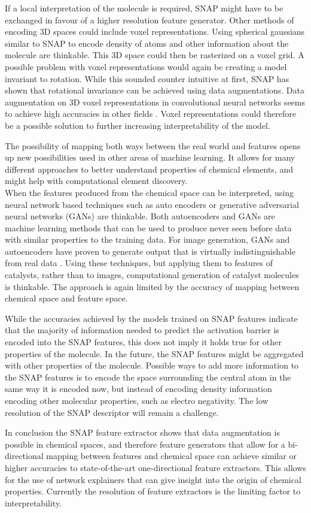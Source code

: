 If a local interpretation of the molecule is required, SNAP might have to be exchanged in favour of a higher resolution 
feature generator.
Other methods of encoding 3D spaces could include voxel representations.
Using spherical gaussians similar to SNAP to encode density of atoms and other information about the molecule are thinkable.
This 3D space could then be rasterized on a voxel grid.
A possible problem with voxel representations would again be creating a model invariant to rotation.
While this sounded counter intuitive at first, SNAP has shown that rotational invariance can be achieved using data augmentations.
Data augmentation on 3D voxel representations in convolutional neural networks seems to achieve high accuracies in 
other fields \cite{7353481}.
Voxel representations could therefore be a possible solution to further increasing interpretability of the model.

The possibility of mapping both ways between the real world and features opens up new possibilities 
used in other areas of machine learning.
It allows for many different approaches to better understand properties of chemical elements, 
and might help with computational element discovery.
\\
When the features produced from the chemical space can be interpreted,
using neural network based techniques such as auto encoders or generative adversarial neural networks (GANs) are thinkable.
Both autoencoders and GANs are machine learning methods that can be used to produce never seen before data with similar properties
to the training data.
For image generation, GANs and autoencoders have proven to generate output that is virtually indistinguishable from real data \cite{karras2019stylebased} .
Using these techniques, but applying them to features of catalysts, rather than to images, computational generation of catalyst molecules is thinkable.
The approach is again limited by the accuracy of mapping between chemical space and feature space.

While the accuracies achieved by the models trained on SNAP features indicate that 
the majority of information needed to predict the activation barrier is encoded into the SNAP features, this does
not imply it holds true for other properties of the molecule.
In the future, the SNAP features might be aggregated with other properties of the molecule.
Possible ways to add more information to the SNAP features is to encode the space surrounding the 
central atom in the same way it is encoded now, but instead of encoding density information encoding 
other molecular properties, such as electro negativity.
The low resolution of the SNAP descriptor will remain a challenge.

In conclusion the SNAP feature extractor shows that data augmentation is possible in chemical spaces, and therefore 
feature generators that allow for a bi-directional mapping between features and chemical space can achieve similar or higher
accuracies to state-of-the-art one-directional feature extractors.
This allows for the use of network explainers that can give insight into the origin of chemical properties.
Currently the resolution of feature extractors is the limiting factor to interpretability.